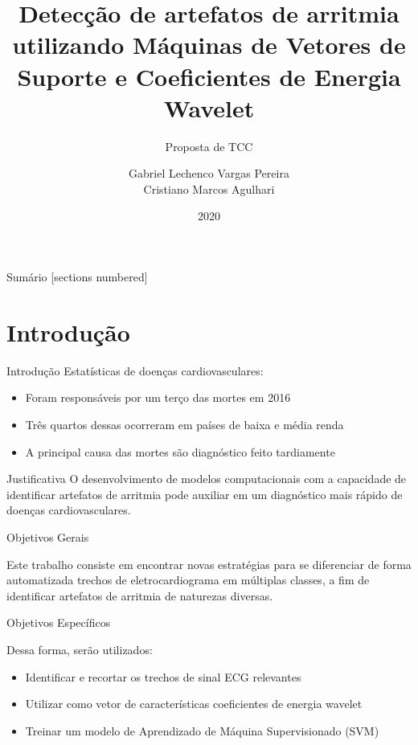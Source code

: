 \documentclass[10pt]{beamer}
\title{Detecção de artefatos de arritmia utilizando Máquinas de Vetores de Suporte e Coeficientes de Energia Wavelet}
\subtitle{Proposta de TCC}
\date{2020}
\author{Gabriel Lechenco Vargas Pereira \\
Cristiano Marcos Agulhari}
\institute{Universidade Tecnológica Federal do Paraná - UTFPR}
\begin{document}

\maketitle

\begin{frame}{Sumário}
  [sections numbered]
  \tableofcontents[hideallsubsections]
\end{frame}

\section{Introdução}

\begin{frame}{Introdução}
    Estatísticas de doenças cardiovasculares: \cite{who_cardiovascular_2017}
    \begin{itemize}
        \item Foram responsáveis por um terço das mortes em 2016 
        \item Três quartos dessas ocorreram em países de baixa e média renda
        \item A principal causa das mortes são diagnóstico feito tardiamente 
    \end{itemize}
\end{frame}

\begin{frame} {Justificativa}
  O desenvolvimento de modelos computacionais com a capacidade de identificar 
  artefatos de arritmia pode auxiliar em um diagnóstico mais rápido de doenças 
  cardiovasculares.
\end{frame}

\begin{frame}{Objetivos Gerais}

  Este trabalho consiste em encontrar novas estratégias para 
  se diferenciar de forma automatizada trechos de eletrocardiograma em múltiplas 
  classes, a fim de identificar artefatos  de  arritmia  de  naturezas  diversas.

\end{frame}

\begin{frame}{Objetivos Específicos}

  Dessa forma, serão utilizados:
  \begin{itemize}
    \item Identificar e recortar os trechos de sinal ECG relevantes
    \item Utilizar como vetor de características coeficientes de energia wavelet
    \item Treinar um modelo de Aprendizado de Máquina Supervisionado (SVM)
  \end{itemize}
\end{frame}
\end{document}

